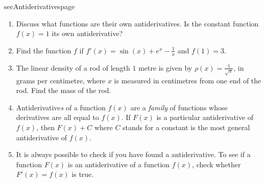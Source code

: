 \documentclass[../main]{subfiles}
\begin{document}
\begin{outline}{sec}{Antiderivatives}{page}
\begin{enumerate}
    \item Discuss what functions are their own antiderivatives.  Is the constant function \(f(x) = 1\) its own antiderivative?

    \item Find the function \(f\) if \(f'(x) = \sin(x) + e^{x} - \frac{1}{x}\) and \(f(1) = 3\).
    \item The linear density of a rod of length \(1\) metre is given by \(\rho(x) = \frac{1}{\sqrt{x}}\), in grams per centimetre, where \(x\) is measured in centimetres from one end of the rod. Find the mass of the rod. %
    \item {Antiderivative\emph{s} of a function \(f(x)\) are a \emph{family} of functions whose derivatives are all equal to \(f(x)\). If \(F(x)\) is a particular antiderivative of \(f(x)\), then \(F(x) + C\) where \(C\) stands for a constant is the most general antiderivative of \(f(x)\). }
    \item {It is always possible to check if you have found a antiderivative. To see if a function \(F(x)\) is an antiderivative of a function \(f(x)\), check whether \(F'(x) = f(x)\) is true.}
  \end{enumerate}
\end{outline}
\end{document}
